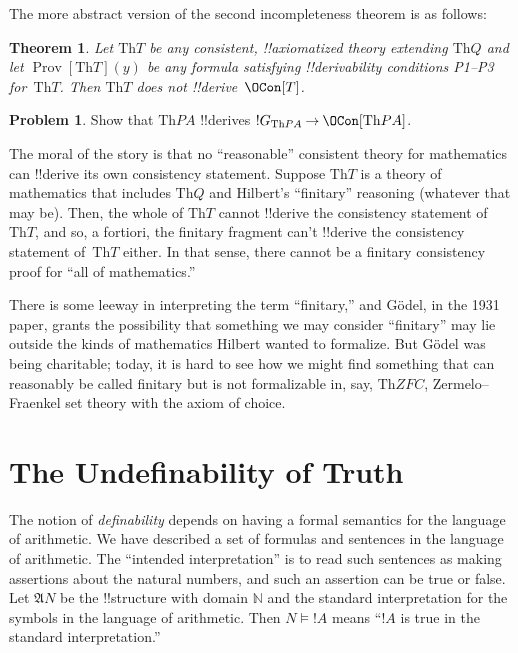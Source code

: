 \documentclass[10pt,a4paper]{article}
\theoremstyle{plain}
\newtheorem{thm}{Theorem}[section]
\theoremstyle{definition}
\newtheorem{prob}{Problem}[section]
\theoremstyle{remark}
\newenvironment{digress}{}{}
\newcommand*{\olfileid}[3]{}
\newcommand*{\olsection}[1]{\section*{#1}}
\newcommand*{\ollabel}[1]{\label{#1}}
\providecommand{\lif}{\mathbin{\rightarrow}}
\providecommand{\Struct}{\ensuremath{\mathfrak{A}}}
\providecommand{\Sat}[2]{\ensuremath{#1 \models #2}}
\providecommand{\Th}{\ensuremath{\mathrm{Th}}}
\providecommand{\Nat}{\ensuremath{\mathbb{N}}}
\providecommand{\OProv}{\operatorname{Prov}}
\begin{document}
The more abstract version of the second incompleteness theorem is as follows:

\begin{thm}
\ollabel{thm:second-incompleteness-gen} Let $\Th{T}$ be any
consistent, !!{axiomatized} theory extending $\Th{Q}$ and let
$\OProv[\Th{T}](y)$ be any formula satisfying !!{derivability} conditions
P1--P3 for~$\Th{T}$. Then $\Th{T}$ does not !!{derive}~$\OCon[T]$.
\end{thm}

\begin{prob}
Show that $\Th{PA}$ !!{derive}s $!G_{\Th{PA}} \lif \OCon[\Th{PA}]$.
\end{prob}

\begin{digress}
The moral of the story is that no ``reasonable'' consistent theory for
mathematics can !!{derive} its own consistency statement. Suppose
$\Th{T}$ is a theory of mathematics that includes $\Th{Q}$ and
Hilbert's ``finitary'' reasoning (whatever that may be). Then, the
whole of $\Th{T}$ cannot !!{derive} the consistency statement of
$\Th{T}$, and so, a fortiori, the finitary fragment can't !!{derive}
the consistency statement of~$\Th{T}$ either. In that sense, there
cannot be a finitary consistency proof for ``all of mathematics.''

There is some leeway in interpreting the term ``finitary,'' and
G\"odel, in the 1931 paper, grants the possibility that something we
may consider ``finitary'' may lie outside the kinds of mathematics
Hilbert wanted to formalize. But G\"odel was being charitable; today,
it is hard to see how we might find something that can reasonably be
called finitary but is not formalizable in, say, $\Th{ZFC}$,
Zermelo--Fraenkel set theory with the axiom of choice.
\end{digress}





\olfileid{inc}{inp}{tar}

\olsection{The Undefinability of Truth}

The notion of \emph{definability} depends on having a formal semantics
for the language of arithmetic.  We have described a set of formulas
and sentences in the language of arithmetic. The ``intended
interpretation'' is to read such sentences as making assertions about
the natural numbers, and such an assertion can be true or false. Let
$\Struct{N}$ be the !!{structure} with domain $\Nat$ and the standard
interpretation for the symbols in the language of arithmetic.  Then
$\Sat{N}{!A}$ means ``$!A$ is true in the standard interpretation.''
\end{document}

